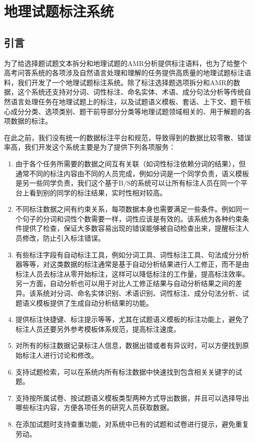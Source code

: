 \documentclass[master, winfont]{njuthesis}
\begin{document}
\chapter{地理试题标注系统}
\label{chapter:tagger}
\section{引言}
为了给选择题试题文本拆分和地理试题的AMR分析提供标注语料，也为了给整个高考问答系统的各项涉及自然语言处理和理解的任务提供高质量的地理试题标注语料，我们开发了一个地理试题标注系统。除了标注选择题选项拆分和AMR的数据，这个系统还支持对分词、词性标注、命名实体、术语、成分句法分析等传统自然语言处理任务在地理试题上的标注，以及试题语义模板、套话、上下文、题干核心成分分类、选项类别、题干前导部分分类等地理试题领域相关的、用于解题的各项数据的标注。

在此之前，我们没有统一的数据标注平台和规范，导致得到的数据比较零散、错误率高，我们开发这个系统主要是为了提供下列各项服务：
\begin{enumerate}
	\item 由于各个任务所需要的数据之间互有关联（如词性标注依赖分词的结果），但通常不同的标注内容由不同的人员完成，例如分词是一个同学负责，语义模板是另一些同学负责，我们这个基于B/S的系统可以让所有标注人员在同一个平台上看到别的同学的标注结果，实时性相对较高。
	\item 不同标注数据之间有约束关系，每项数据本身也需要满足一些条件。例如同一个句子的分词和词性个数需要一样，词性应该是有效的。该系统为各种约束条件提供了检查，保证大多数容易出现的错误能够被自动检查出来，提醒标注人员修改，防止引入标注错误。
	\item 有些标注字段有自动标注工具，例如分词工具、词性标注工具、句法成分分析器等等，对这类数据的标注通常是基于自动分析结果进行人工修正，而不是由标注人员去标注从零开始标注，这样可以降低标注的工作量，提高标注效率。另一方面，自动分析也可以用于对比人工修正结果与自动分析结果之间的差异。该系统对分词、命名实体识别、术语识别、词性标注、成分句法分析、试题语义模板提供了生成自动分析结果的功能。
	\item 提供标注快捷键、标注提示等等，尤其在试题语义模板的标注功能上，避免了标注人员还要另外参考模板体系规范，提高标注速度。
	\item 对所有的标注数据记录标注人信息，数据出错或者有异议时，可以方便找到原始标注人进行讨论和修改。
	\item 支持试题检索，可以在系统内所有标注数据中快速找到包含相关关键字的试题。
	\item 支持按所属试卷、按试题语义模板类型两种方式导出数据，并且可以选择导出哪些标注内容，方便各项任务的研究人员获取数据。
	\item 在添加试题时支持查重功能，对系统中已有的试题和试卷进行提示，避免重复劳动。
\end{enumerate}
\end{document}
